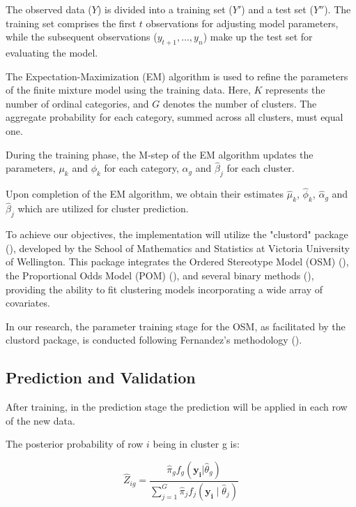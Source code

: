 \documentclass{article}
\begin{document}
The observed data ($Y$) is divided into a training set ($Y'$) and a test set ($Y''$). The training set comprises the first $t$ observations for adjusting model parameters, while the subsequent observations ($y_{t+1}, \dots, y_n$) make up the test set for evaluating the model.

The Expectation-Maximization (EM) algorithm is used to refine the parameters of the finite mixture model using the training data. Here, $K$ represents the number of ordinal categories, and $G$ denotes the number of clusters. The aggregate probability for each category, summed across all clusters, must equal one.

During the training phase, the M-step of the EM algorithm updates the parameters, $\mu_k$ and $\phi_k$ for each category, $\alpha_g$ and $\hat{\beta}_j$ for each cluster.

Upon completion of the EM algorithm, we obtain their estimates $\hat{\mu}_k$, $\hat{\phi}_k$, $\hat{\alpha}_g$ and $\hat{\beta}_j$ which are utilized for cluster prediction.

To achieve our objectives, the implementation will utilize the "clustord" package (\cite{clustord2024}), 
developed by the School of Mathematics and Statistics at Victoria University of Wellington. 
This package integrates the Ordered Stereotype Model (OSM) (\cite{fernandez2016mixture}), the Proportional Odds Model (POM) (\cite{matechou2016biclustering}), and several binary methods (\cite{pledger2014multivariate}), 
providing the ability to fit clustering models incorporating a wide array of covariates.

In our research, the parameter training stage for the OSM, as facilitated by the clustord package, is conducted following Fernandez's methodology (\cite{fernandez2016mixture}).

\subsection{Prediction and Validation}

After training, in the prediction stage the prediction will be applied in each row of the new data.

The posterior probability of row $i$ being in cluster g is:


\begin{equation}
  \hat{Z}_{ig} = \frac{\hat{\pi}_g f_g(\mathbf{y_i}|\hat{\theta}_g)}{\sum_{j=1}^{G} \hat{\pi}_j f_j(\mathbf{y_i} \mid \hat{\theta}_j)}
\end{equation}
\end{document}
